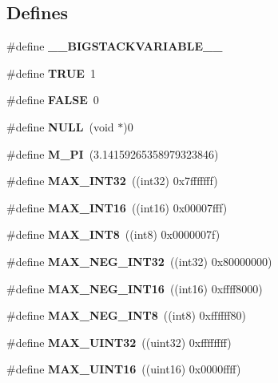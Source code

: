 \subsection*{Defines}
\begin{CompactItemize}
\item 
\#define \textbf{\_\-\_\-BIGSTACKVARIABLE\_\-\_\-}\label{prim__type_8h_64d603953ff96570ac4072daaeaeb36b}

\item 
\#define \textbf{TRUE}~1\label{prim__type_8h_a8cecfc5c5c054d2875c03e77b7be15d}

\item 
\#define \textbf{FALSE}~0\label{prim__type_8h_a93f0eb578d23995850d61f7d61c55c1}

\item 
\#define \textbf{NULL}~(void $\ast$)0\label{prim__type_8h_070d2ce7b6bb7e5c05602aa8c308d0c4}

\item 
\#define \textbf{M\_\-PI}~(3.14159265358979323846)\label{prim__type_8h_e71449b1cc6e6250b91f539153a7a0d3}

\item 
\#define \textbf{MAX\_\-INT32}~((int32) 0x7fffffff)\label{prim__type_8h_ac62d87844689a18b6f5339a89ed6e7f}

\item 
\#define \textbf{MAX\_\-INT16}~((int16) 0x00007fff)\label{prim__type_8h_3905e54374e49708219791e7d59c60fb}

\item 
\#define \textbf{MAX\_\-INT8}~((int8)  0x0000007f)\label{prim__type_8h_a092b7d509790c28edc065b23de6e39e}

\item 
\#define \textbf{MAX\_\-NEG\_\-INT32}~((int32) 0x80000000)\label{prim__type_8h_29962133c3b9c5c2cf72f7d9299fd4a0}

\item 
\#define \textbf{MAX\_\-NEG\_\-INT16}~((int16) 0xffff8000)\label{prim__type_8h_4338527c828e68762d8b40e01f0e0869}

\item 
\#define \textbf{MAX\_\-NEG\_\-INT8}~((int8)  0xffffff80)\label{prim__type_8h_76a3e608c93aff0ad98b3b742c51d38f}

\item 
\#define \textbf{MAX\_\-UINT32}~((uint32) 0xffffffff)\label{prim__type_8h_26248174abf27973b9edfa9b70ba4c93}

\item 
\#define \textbf{MAX\_\-UINT16}~((uint16) 0x0000ffff)\label{prim__type_8h_bc023544d8096a8fa1bd1f6f6f90bc41}


\end{CompactItemize}
